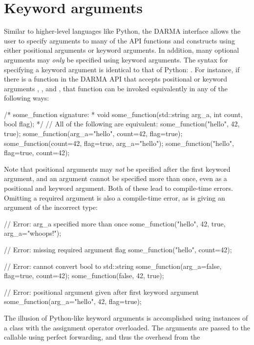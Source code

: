 \section{Keyword arguments}
\label{sec:keyword}
Similar to higher-level languages like Python, the DARMA \CC{} interface allows the user
to specify arguments to many of the \gls{API} functions and constructs using
either \glspl{positional argument}
or \glspl{keyword argument}. In addition, many optional arguments may {\em only} be specified using
\glspl{keyword argument}. The syntax for specifying a \gls{keyword argument} is identical to that
of Python: .  For instance, if there is 
a function  in the DARMA \gls{API} that accepts 
positional or \glspl{keyword argument} , 
, and , that function can be invoked 
equivalently in any of the following ways:
\begin{CppCode}
/* some_function signature:
 *  void some_function(std::string arg_a, int count, bool flag);
 */
// All of the following are equivalent:
some_function("hello", 42, true);
some_function(arg_a="hello", count=42, flag=true);
some_function(count=42, flag=true, arg_a="hello");
some_function("hello", flag=true, count=42);
\end{CppCode}
Note that \glspl{positional argument} may {\em not} be specified after the
first \gls{keyword argument},
and an argument cannot be specified more than once, even as a positional and
\gls{keyword argument}.  Both of these lead to compile-time errors. Omitting a required argument is 
also a compile-time error, as is giving an argument of the incorrect type: 
\begin{CppCode}
// Error: arg_a specified more than once
some_function("hello", 42, true, arg_a="whoops!");

// Error: missing required argument flag
some_function("hello", count=42);

// Error: cannot convert bool to std::string
some_function(arg_a=false, flag=true, count=42);
some_function(false, 42, true);

// Error: positional argument given after first keyword argument
some_function(arg_a="hello", 42, flag=true);
\end{CppCode}
The illusion of Python-like \glspl{keyword argument} is accomplished 
using  instances
of a class with the assignment operator overloaded.  The arguments are passed to the 
callable using \gls{perfect forwarding}, and thus the overhead from the
